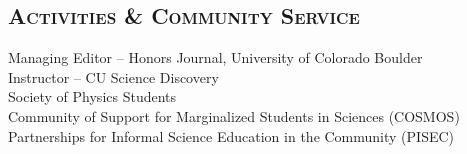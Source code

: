 \documentclass[11pt,line,letterpaper,margin]{res}
\begin{document}
\begin{resume}
\section{\scshape Activities \& Community Service}   
            Managing Editor – Honors Journal, University of Colorado Boulder \\
            Instructor – CU Science Discovery\\
            Society of Physics Students \\
            Community of Support for Marginalized Students in Sciences (COSMOS)\\
            Partnerships for Informal Science Education in the Community (PISEC) \\            
%
%
%
%



\end{resume}
\end{document}
